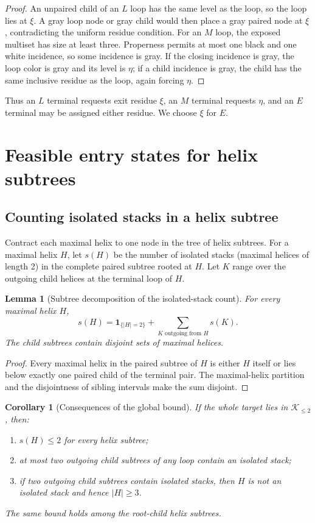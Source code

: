 \documentclass[11pt]{article}
\newtheorem{lemma}[theorem]{Lemma}
\newtheorem{corollary}[theorem]{Corollary}
\newcommand{\Ktwo}{\mathcal{K}_{\le 2}}
\newcommand{\shortcount}{s}
\begin{document}
\begin{proof}
An unpaired child of an $L$ loop has the same level as the loop, so the loop lies at $\xi$.  A gray loop node or gray child would then place a gray paired node at $\xi$, contradicting the uniform residue condition.  For an $M$ loop, the exposed multiset has size at least three.  Properness permits at most one black and one white incidence, so some incidence is gray.  If the closing incidence is gray, the loop color is gray and its level is $\eta$; if a child incidence is gray, the child has the same inclusive residue as the loop, again forcing $\eta$.
\end{proof}

Thus an $L$ terminal requests exit residue $\xi$, an $M$ terminal requests $\eta$, and an $E$ terminal may be assigned either residue.  We choose $\xi$ for $E$.

\section{Feasible entry states for helix subtrees}
\label{sec:resource}

\subsection{Counting isolated stacks in a helix subtree}

Contract each maximal helix to one node in the tree of helix subtrees.  For a maximal helix $H$, let $\shortcount(H)$ be the number of isolated stacks (maximal helices of length 2) in the complete paired subtree rooted at $H$.  Let $K$ range over the outgoing child helices at the terminal loop of $H$.

\begin{lemma}[Subtree decomposition of the isolated-stack count]
\label{lem:short-decomp}
For every maximal helix $H$,
\[
\shortcount(H)
=
\mathbf 1_{\{|H|=2\}}
+
\sum_{K\text{ outgoing from }H}\shortcount(K).
\]
The child subtrees contain disjoint sets of maximal helices.
\end{lemma}

\begin{proof}
Every maximal helix in the paired subtree of $H$ is either $H$ itself or lies below exactly one paired child of the terminal pair.  The maximal-helix partition and the disjointness of sibling intervals make the sum disjoint.
\end{proof}

\begin{corollary}[Consequences of the global bound]
\label{cor:resource-bounds}
If the whole target lies in $\Ktwo$, then:
\begin{enumerate}
\item $\shortcount(H)\le2$ for every helix subtree;
\item at most two outgoing child subtrees of any loop contain an isolated stack;
\item if two outgoing child subtrees contain isolated stacks, then $H$ is not an isolated stack and hence $|H|\ge3$.
\end{enumerate}
The same bound holds among the root-child helix subtrees.
\end{corollary}
\end{document}
